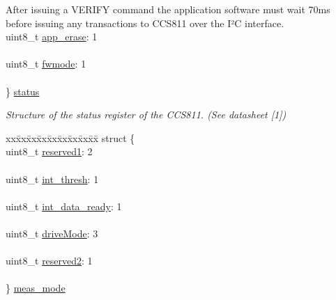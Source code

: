 \begin{DoxyCompactItemize}
\begin{tabbing}
{ After issuing a VERIFY command the application software must wait 70ms before issuing any transactions to CCS811 over the I²C interface. }\\
\>uint8\_t \mbox{\hyperlink{union_application_register_a24297bc3eb56e16f4d862a69eb773786}{app\_erase}}: 1\\
\>\\
\>uint8\_t \mbox{\hyperlink{union_application_register_aacc84f0d7fba3fd77eff42c1963ece89}{fwmode}}: 1\\
\>\\
\} \mbox{\hyperlink{union_application_register_a99b0728eb13db9f7e1b6c51cb062ecac}{status}}\\

\end{tabbing}\begin{DoxyCompactList}\small\item\em Structure of the status register of the C\+C\+S811. (See datasheet \mbox{[}1\mbox{]}) \end{DoxyCompactList}\item 
\begin{tabbing}
xx\=xx\=xx\=xx\=xx\=xx\=xx\=xx\=xx\=\kill
struct \{\\
\>uint8\_t \mbox{\hyperlink{union_application_register_a2a2556147677ece60b8aadf4a0d608ed}{reserved1}}: 2\\
\>\\
\>uint8\_t \mbox{\hyperlink{union_application_register_a0632faf7c6c7fe7dde6437fadea96dfd}{int\_thresh}}: 1\\
\>\\
\>uint8\_t \mbox{\hyperlink{union_application_register_a16598183bfc37e17f0b615a726e9e806}{int\_data\_ready}}: 1\\
\>\\
\>uint8\_t \mbox{\hyperlink{union_application_register_a60b8fb17f5de49bf24544c4ffc59d099}{driveMode}}: 3\\
\>\\
\>uint8\_t \mbox{\hyperlink{union_application_register_a646df3514a24749a0f54731bf41c6c67}{reserved2}}: 1\\
\>\\
\} \mbox{\hyperlink{union_application_register_ab78fc84f99f28c290625db387ae27fd2}{meas\_mode}}\\


\end{tabbing}
\end{DoxyCompactItemize}
